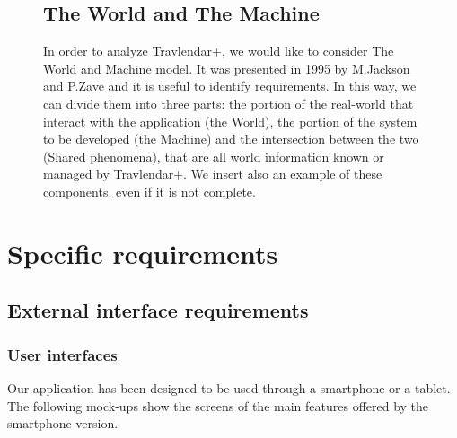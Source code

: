 \documentclass[12pt,titlepage]{article}
\begin{document}
\begin{figure}
\subsection{The World and The Machine}\label{sec:mod1}
\begin{flushleft}
In order to analyze Travlendar+, we would like to consider The World and Machine model. It was presented in 1995 by M.Jackson and P.Zave and it is useful to identify requirements. In this way, we can divide them into three parts: the portion of the real-world that interact with the application (the World), the portion of the system to be developed (the Machine) and the intersection between the two (Shared phenomena), that are all world information known or managed by Travlendar+.
We insert also an example of these components, even if it is not complete.
\end{flushleft}

\centering
{}
\end{figure}

\pagebreak
\section{Specific requirements}\label{sec:crit}

\subsection{External interface requirements}\label{sec:mod1}
\subsubsection{User interfaces}\label{sec:mod1}
Our application has been designed to be used through a smartphone or a tablet.
The following mock-ups show the screens of the main features offered by the smartphone version. 
\end{document}
